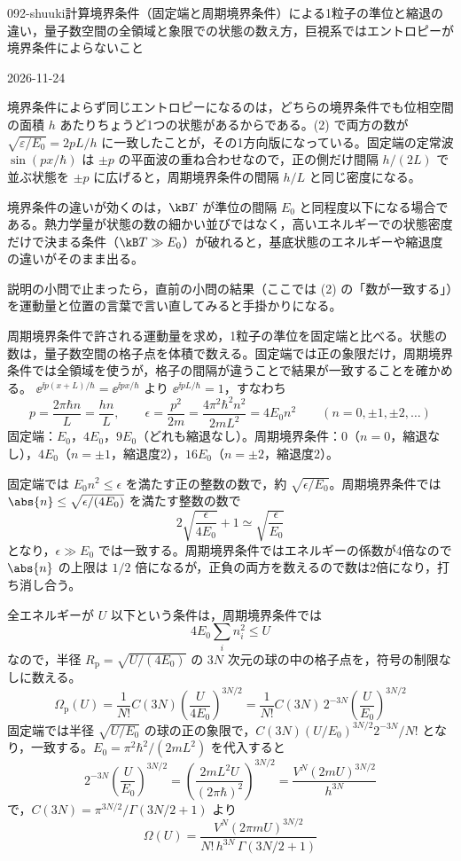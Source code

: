 \documentclass[uplatex,dvipdfmx,a4paper,11pt]{jsarticle}
\begin{document}
\begin{mondai}{092-shuuki}{計算}{境界条件（固定端と周期境界条件）による1粒子の準位と縮退の違い，量子数空間の全領域と象限での状態の数え方，巨視系ではエントロピーが境界条件によらないこと}
\begin{kotaeutsushi}{2026-11-24}
\end{kotaeutsushi}
\begin{kizuki}
\item 境界条件によらず同じエントロピーになるのは，どちらの境界条件でも位相空間の面積 $h$ あたりちょうど1つの状態があるからである。(2) で両方の数が $\sqrt{\varepsilon/E_{0}}=2pL/h$ に一致したことが，その1方向版になっている。固定端の定常波 $\sin(px/\hbar)$ は $\pm p$ の平面波の重ね合わせなので，正の側だけ間隔 $h/(2L)$ で並ぶ状態を $\pm p$ に広げると，周期境界条件の間隔 $h/L$ と同じ密度になる。
\item 境界条件の違いが効くのは，$\kB T$ が準位の間隔 $E_{0}$ と同程度以下になる場合である。熱力学量が状態の数の細かい並びではなく，高いエネルギーでの状態密度だけで決まる条件（$\kB T\gg E_{0}$）が破れると，基底状態のエネルギーや縮退度の違いがそのまま出る。
\item 説明の小問で止まったら，直前の小問の結果（ここでは (2) の「数が一致する」）を運動量と位置の言葉で言い直してみると手掛かりになる。
\end{kizuki}
\begin{tadashii}
\houshin 周期境界条件で許される運動量を求め，1粒子の準位を固定端と比べる。状態の数は，量子数空間の格子点を体積で数える。固定端では正の象限だけ，周期境界条件では全領域を使うが，格子の間隔が違うことで結果が一致することを確かめる。
\keisan {} $\ee^{\ii p(x+L)/\hbar}=\ee^{\ii px/\hbar}$ より $\ee^{\ii pL/\hbar}=1$，すなわち
\[ p=\frac{2\pi\hbar n}{L}=\frac{hn}{L},\qquad\epsilon=\frac{p^{2}}{2m}=\frac{4\pi^{2}\hbar^{2}n^{2}}{2mL^{2}}=4E_{0}n^{2}\qquad(n=0,\pm1,\pm2,\dots) \]
固定端：$E_{0}$，$4E_{0}$，$9E_{0}$（どれも縮退なし）。周期境界条件：$0$（$n=0$，縮退なし），$4E_{0}$（$n=\pm1$，縮退度2），$16E_{0}$（$n=\pm2$，縮退度2）。

 固定端では $E_{0}n^{2}\le\epsilon$ を満たす正の整数の数で，約 $\sqrt{\epsilon/E_{0}}$。周期境界条件では $\abs{n}\le\sqrt{\epsilon/(4E_{0})}$ を満たす整数の数で
\[ 2\sqrt{\frac{\epsilon}{4E_{0}}}+1\simeq\sqrt{\frac{\epsilon}{E_{0}}} \]
となり，$\epsilon\gg E_{0}$ では一致する。周期境界条件ではエネルギーの係数が4倍なので $\abs{n}$ の上限は $1/2$ 倍になるが，正負の両方を数えるので数は2倍になり，打ち消し合う。

 全エネルギーが $U$ 以下という条件は，周期境界条件では
\[ 4E_{0}\sum_{i}n_{i}^{2}\le U \]
なので，半径 $R_{\mathrm{p}}=\sqrt{U/(4E_{0})}$ の $3N$ 次元の球の中の格子点を，符号の制限なしに数える。
\[ \Omega_{\mathrm{p}}(U)=\frac{1}{N!}C(3N)\left(\frac{U}{4E_{0}}\right)^{3N/2}=\frac{1}{N!}C(3N)\,2^{-3N}\left(\frac{U}{E_{0}}\right)^{3N/2} \]
固定端では半径 $\sqrt{U/E_{0}}$ の球の正の象限で，$C(3N)(U/E_{0})^{3N/2}2^{-3N}/N!$ となり，一致する。$E_{0}=\pi^{2}\hbar^{2}/(2mL^{2})$ を代入すると
\[ 2^{-3N}\left(\frac{U}{E_{0}}\right)^{3N/2}=\left(\frac{2mL^{2}U}{(2\pi\hbar)^{2}}\right)^{3N/2}=\frac{V^{N}(2mU)^{3N/2}}{h^{3N}} \]
で，$C(3N)=\pi^{3N/2}/\Gamma(3N/2+1)$ より
\[ \Omega(U)=\frac{V^{N}(2\pi mU)^{3N/2}}{N!\,h^{3N}\,\Gamma(3N/2+1)} \]


\end{tadashii}
\end{mondai}
\end{document}
